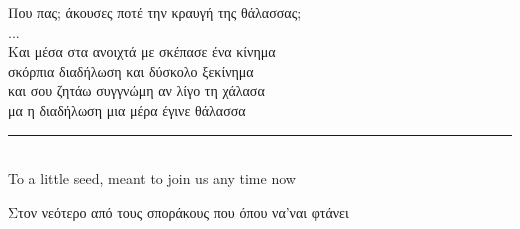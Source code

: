 \documentclass[master=elt, cleveref, autoref, masteroption=eg]{kulemt}
\begin{document}
\begin{preface}
   \foreignlanguage{greek}{
      \hspace*{\fill} Που πας; άκουσες ποτέ την κραυγή της θάλασσας;  \\
      \hspace*{\fill} ... \\
      \hspace*{\fill} Και μέσα στα ανοιχτά με σκέπασε ένα κίνημα\\
      \hspace*{\fill} σκόρπια διαδήλωση και δύσκολο ξεκίνημα\\
      \hspace*{\fill} και σου ζητάω συγγνώμη αν λίγο τη χάλασα\\
      \hspace*{\fill} μα η διαδήλωση μια μέρα έγινε θάλασσα\\
   }

   \noindent\hfil\rule{0.5\textwidth}{.4pt}\hfil \\
 
   To a little seed, meant to join us any time now

   \foreignlanguage{greek}{Στον νεότερο από τους σποράκους που όπου να'ναι φτάνει}


\end{preface}

\tableofcontents
\newpage
\end{document}
